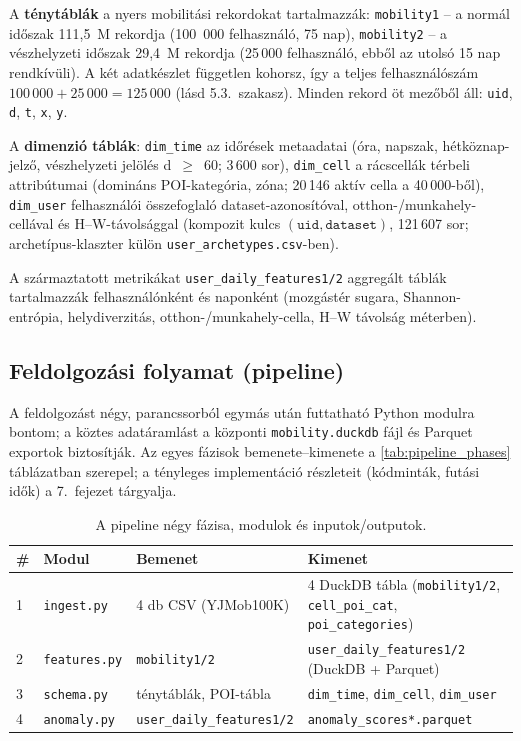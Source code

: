 A \textbf{ténytáblák} a nyers mobilitási rekordokat tartalmazzák: \texttt{mobility1} -- a normál időszak 111{,}5~M rekordja (100~000 felhasználó, 75 nap), \texttt{mobility2} -- a vészhelyzeti időszak 29{,}4~M rekordja (25\,000 felhasználó, ebből az utolsó 15 nap rendkívüli). A két adatkészlet független kohorsz, így a teljes felhasználószám $100\,000 + 25\,000 = 125\,000$ (lásd 5.3.\ szakasz). Minden rekord öt mezőből áll: \texttt{uid}, \texttt{d}, \texttt{t}, \texttt{x}, \texttt{y}.

A \textbf{dimenzió táblák}: \texttt{dim\_time} az időrések metaadatai (óra, napszak, hétköznap-jelző, vészhelyzeti jelölés d~$\geq$~60; 3\,600 sor), \texttt{dim\_cell} a rácscellák térbeli attribútumai (domináns POI-kategória, zóna; 20\,146 aktív cella a 40\,000-ből), \texttt{dim\_user} felhasználói összefoglaló dataset-azonosítóval, otthon-/munkahely-cellával és H--W-távolsággal (kompozit kulcs $(\texttt{uid}, \texttt{dataset})$, 121\,607 sor; archetípus-klaszter külön \texttt{user\_archetypes.csv}-ben).

A származtatott metrikákat \texttt{user\_daily\_features1/2} aggregált táblák tartalmazzák felhasználónként és naponként (mozgástér sugara, Shannon-entrópia, helydiverzitás, otthon-/munkahely-cella, H--W távolság méterben).

\subsection{Feldolgozási folyamat (pipeline)}

A feldolgozást négy, parancssorból egymás után futtatható Python modulra bontom; a köztes adatáramlást a központi \texttt{mobility.duckdb} fájl és Parquet exportok biztosítják. Az egyes fázisok bemenete--kimenete a \autoref{tab:pipeline_phases} táblázatban szerepel; a tényleges implementáció részleteit (kódminták, futási idők) a 7.\ fejezet tárgyalja.

\begin{table}[H]
\centering
\caption{A pipeline négy fázisa, modulok és inputok/outputok.}
\label{tab:pipeline_phases}
\begin{tabular}{l l p{4.5cm} p{4.5cm}}
\hline
\textbf{\#} & \textbf{Modul} & \textbf{Bemenet} & \textbf{Kimenet} \\
\hline
1 & \texttt{ingest.py}   & 4 db CSV (YJMob100K) & 4 DuckDB tábla (\texttt{mobility1/2}, \texttt{cell\_poi\_cat}, \texttt{poi\_categories}) \\
2 & \texttt{features.py} & \texttt{mobility1/2} & \texttt{user\_daily\_features1/2} (DuckDB + Parquet) \\
3 & \texttt{schema.py}   & ténytáblák, POI-tábla & \texttt{dim\_time}, \texttt{dim\_cell}, \texttt{dim\_user} \\
4 & \texttt{anomaly.py}  & \texttt{user\_daily\_features1/2} & \texttt{anomaly\_scores*.parquet} \\
\hline
\end{tabular}
\end{table}

